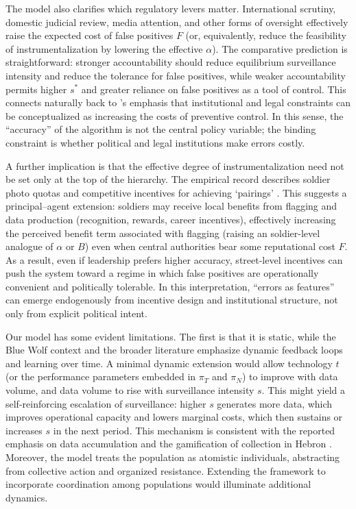 \documentclass[11pt,a4paper]{article}
\theoremstyle{definition}
\theoremstyle{remark}
\theoremstyle{definition}
\begin{document}
The model also clarifies which regulatory levers matter. International scrutiny, domestic judicial review, media attention, and other forms of 
oversight effectively raise the expected cost of false positives $F$ (or, equivalently, reduce the feasibility of instrumentalization by lowering 
the effective $\alpha$). The comparative prediction is straightforward: stronger accountability should reduce equilibrium surveillance intensity 
and reduce the tolerance for false positives, while weaker accountability permits higher $s^*$ and greater reliance on false positives as a tool 
of control. This connects naturally back to \citet{dragu2021digital}'s emphasis that institutional and legal constraints can be conceptualized as 
increasing the costs of preventive control. In this sense, the ``accuracy'' of the algorithm is not the central policy variable; the binding 
constraint is whether political and legal institutions make errors costly. 

A further implication is that the effective degree of instrumentalization need not be set only at the top of the hierarchy. The empirical record 
describes soldier photo quotas and competitive incentives for achieving `pairings' \citep{kubovich2022israeli}. This suggests a principal--agent 
extension: soldiers may receive local benefits from flagging and data production (recognition, rewards, career incentives), effectively 
increasing the perceived benefit term associated with flagging (raising an soldier-level analogue of $\alpha$ or $B$) even when central 
authorities bear some reputational cost $F$. As a result, even if leadership prefers higher accuracy, street-level incentives can push the system 
toward a regime in which false positives are operationally convenient and politically tolerable. In this interpretation, ``errors as features'' 
can emerge endogenously from incentive design and institutional structure, not only from explicit political intent.

Our model has some evident limitations. The first is that it is static, while the Blue Wolf context and the broader literature emphasize dynamic feedback 
loops and learning over time. A minimal dynamic extension would allow technology $t$ (or the performance parameters embedded in $\pi_T$ and $\pi_N$) 
to improve with data volume, and data volume to rise with surveillance intensity $s$. This might yield a self-reinforcing escalation of surveillance: 
higher $s$ generates more data, which improves operational capacity and lowers marginal costs, 
which then sustains or increases $s$ in the next period. This mechanism is consistent with the reported emphasis on data accumulation and the gamification 
of collection in Hebron \citep{kubovich2022israeli, goodfriend2023algorithmic}. Moreover, the model treats the population as atomistic individuals, 
abstracting from collective action and organized resistance. Extending the framework to incorporate coordination among populations would 
illuminate additional dynamics. 
\end{document}
